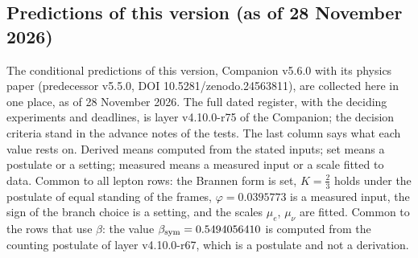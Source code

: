 \subsection{Predictions of this version (as of 28 November 2026)}

The conditional predictions of this version, Companion v5.6.0 with its
physics paper (predecessor v5.5.0, DOI 10.5281/zenodo.24563811), are
collected here in one place, as of 28 November 2026. The full dated register, with the deciding experiments and
deadlines, is layer v4.10.0-r75 of the Companion; the decision criteria
stand in the advance notes of the tests. The last column says what each
value rests on. Derived means computed from the stated inputs; set means
a postulate or a setting; measured means a measured input or a scale
fitted to data. Common to all lepton rows: the Brannen form is set,
$K=\tfrac23$ holds under the postulate of equal standing of the frames,
$\varphi=0.0395773$ is a measured input, the sign of the branch choice is
a setting, and the scales $\mu_e$, $\mu_\nu$ are fitted. Common to the
rows that use $\beta$: the value $\beta_{\rm sym}=0.5494056410$ is computed
from the counting postulate of layer v4.10.0-r67, which is a postulate
and not a derivation.

